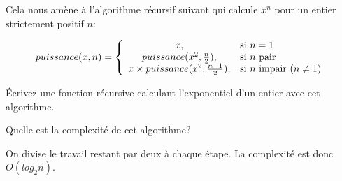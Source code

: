 \documentclass[10pt]{article}\usepackage[correction]{esial}
\begin{document}
Cela nous amène à l'algorithme récursif suivant qui calcule $x^n$ pour un
entier strictement positif $n$:

$$puissance(x,n)=\left\{
\begin{array}{c l}
  x, & \text{si }n=1\\
  puissance(x^2,\frac{n}{2}), &\text{si $n$ pair}\\
  x\times puissance(x^2,\frac{n-1}{2}), &\text{si $n$ impair ($n\neq 1$)}
\end{array}\right.$$


\begin{Question}
  Écrivez une fonction récursive calculant l'exponentiel d'un entier avec cet
  algorithme.
\end{Question}
\begin{Reponse}
\end{Reponse}

\begin{Question}
  Quelle est la complexité de cet algorithme?
\end{Question}
\begin{Reponse}
  On divise le travail restant par  deux à chaque étape. La complexité est donc
  $O(log_2n)$.
\end{Reponse}
\end{document}
